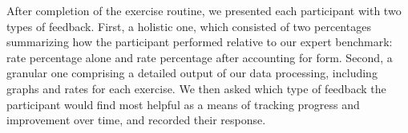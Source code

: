 After completion of the exercise routine, we presented each participant with two types of feedback. First, a holistic one, which consisted of two percentages summarizing how the participant performed relative to our expert benchmark: rate percentage alone and rate percentage after accounting for form.  Second, a granular one comprising a detailed output of our data processing, including graphs and rates for each exercise. We then asked which type of feedback the participant would find most helpful as a means of tracking progress and improvement over time, and recorded their response. 
